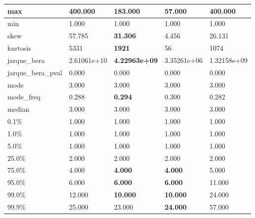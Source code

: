 \begin{table}[H]
\begin{tabular}{|l|m{10em}|m{10em}|m{10em}|m{10em}|}
\hline max & 400.000 & 183.000 & \cellcolor[rgb]{0.9, 0.54, 0.52} 57.000 & \bfseries 400.000 \\
\hline min & 1.000 & 1.000 & 1.000 & 1.000 \\
\hline skew & 57.785 & \bfseries 31.306 & \cellcolor[rgb]{0.9, 0.54, 0.52} 4.456 & 26.131 \\
\hline kurtosis & 5331 & \bfseries 1921 & \cellcolor[rgb]{0.9, 0.54, 0.52} 56 & 1074 \\
\hline jarque\_bera & 2.61061e+10 & \bfseries 4.22963e+09 & \cellcolor[rgb]{0.9, 0.54, 0.52} 3.35261e+06 & 1.32158e+09 \\
\hline jarque\_bera\_pval & 0.000 & 0.000 & 0.000 & 0.000 \\
\hline mode & 3.000 & 3.000 & 3.000 & 3.000 \\
\hline mode\_freq & 0.288 & \bfseries 0.294 & \cellcolor[rgb]{0.9, 0.54, 0.52} 0.300 & 0.282 \\
\hline median & 3.000 & 3.000 & 3.000 & 3.000 \\
\hline 0.1\% & 1.000 & 1.000 & 1.000 & 1.000 \\
\hline 1.0\% & 1.000 & 1.000 & 1.000 & 1.000 \\
\hline 5.0\% & 1.000 & 1.000 & 1.000 & 1.000 \\
\hline 25.0\% & 2.000 & 2.000 & 2.000 & 2.000 \\
\hline 75.0\% & 4.000 & \bfseries 4.000 & \bfseries 4.000 & \cellcolor[rgb]{0.9, 0.54, 0.52} 5.000 \\
\hline 95.0\% & 6.000 & \bfseries 6.000 & \bfseries 6.000 & \cellcolor[rgb]{0.9, 0.54, 0.52} 11.000 \\
\hline 99.0\% & 12.000 & \bfseries 10.000 & \bfseries 10.000 & \cellcolor[rgb]{0.9, 0.54, 0.52} 24.000 \\
\hline 99.9\% & 25.000 & 23.000 & \bfseries 24.000 & \cellcolor[rgb]{0.9, 0.54, 0.52} 57.000 \\
\hline
\end{tabular}
\end{table}

